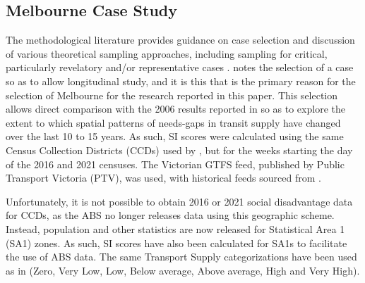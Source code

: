 \documentclass[preprint, 3p,
authoryear]{elsarticle} %
\begin{document}
\subsection{Melbourne Case Study}\label{melbourne-case-study}

The methodological literature provides guidance on case selection and
discussion of various theoretical sampling approaches, including
sampling for critical, particularly revelatory and/or representative
cases
\citep{Eisenhardt1989aa, Yin2009aa, Denscombe2007aa, Eisenhardt2007TBfC}.
\citet{Yin2009aa} notes the selection of a case so as to allow
longitudinal study, and it is this that is the primary reason for the
selection of Melbourne for the research reported in this paper. This
selection allows direct comparison with the 2006 results reported in
\citet{currie2010identifying} so as to explore the extent to which
spatial patterns of needs-gaps in transit supply have changed over the
last 10 to 15 years. As such, SI scores were calculated using the same
Census Collection Districts (CCDs) used by
\citet{currie2010identifying}, but for the weeks starting the day of the
2016 and 2021 censuses. The Victorian GTFS feed, published by Public
Transport Victoria (PTV), was used, with historical feeds sourced from
\citet{transitfeeds_victoria:2023aa}.

Unfortunately, it is not possible to obtain 2016 or 2021 social
disadvantage data for CCDs, as the ABS no longer releases data using
this geographic scheme. Instead, population and other statistics are now
released for Statistical Area 1 (SA1) zones. As such, SI scores have
also been calculated for SA1s to facilitate the use of ABS data. The
same Transport Supply categorizations have been used as in
\citet{currie2010identifying} (Zero, Very Low, Low, Below average, Above
average, High and Very High).
\end{document}
